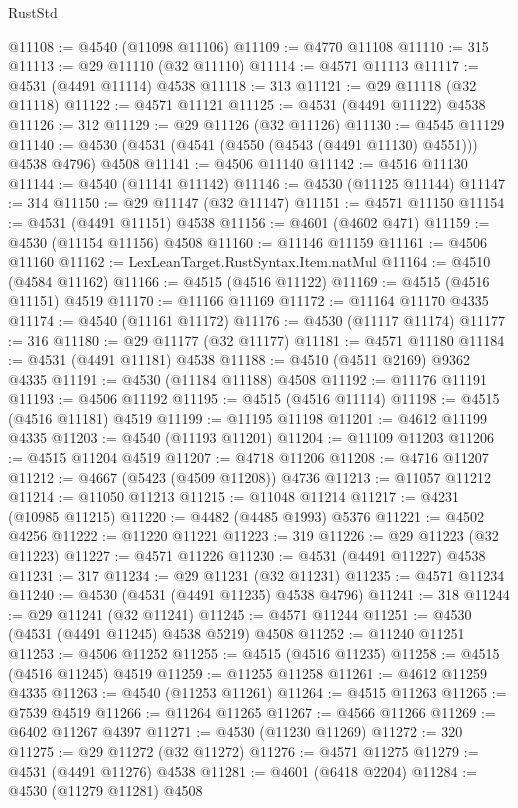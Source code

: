 \begin{lexlean}{RustStd}
\begin{coremodule}
@11108 := @4540 (@11098 @11106)
@11109 := @4770 @11108
@11110 := 315
@11113 := @29 @11110 (@32 @11110)
@11114 := @4571 @11113
@11117 := @4531 (@4491 @11114) @4538
@11118 := 313
@11121 := @29 @11118 (@32 @11118)
@11122 := @4571 @11121
@11125 := @4531 (@4491 @11122) @4538
@11126 := 312
@11129 := @29 @11126 (@32 @11126)
@11130 := @4545 @11129
@11140 := @4530 (@4531 (@4541 (@4550 (@4543 (@4491 @11130) @4551))) @4538 @4796) @4508
@11141 := @4506 @11140
@11142 := @4516 @11130
@11144 := @4540 (@11141 @11142)
@11146 := @4530 (@11125 @11144)
@11147 := 314
@11150 := @29 @11147 (@32 @11147)
@11151 := @4571 @11150
@11154 := @4531 (@4491 @11151) @4538
@11156 := @4601 (@4602 @471)
@11159 := @4530 (@11154 @11156) @4508
@11160 := @11146 @11159
@11161 := @4506 @11160
@11162 := LexLeanTarget.RustSyntax.Item.natMul
@11164 := @4510 (@4584 @11162)
@11166 := @4515 (@4516 @11122)
@11169 := @4515 (@4516 @11151) @4519
@11170 := @11166 @11169
@11172 := @11164 @11170 @4335
@11174 := @4540 (@11161 @11172)
@11176 := @4530 (@11117 @11174)
@11177 := 316
@11180 := @29 @11177 (@32 @11177)
@11181 := @4571 @11180
@11184 := @4531 (@4491 @11181) @4538
@11188 := @4510 (@4511 @2169) @9362 @4335
@11191 := @4530 (@11184 @11188) @4508
@11192 := @11176 @11191
@11193 := @4506 @11192
@11195 := @4515 (@4516 @11114)
@11198 := @4515 (@4516 @11181) @4519
@11199 := @11195 @11198
@11201 := @4612 @11199 @4335
@11203 := @4540 (@11193 @11201)
@11204 := @11109 @11203
@11206 := @4515 @11204 @4519
@11207 := @4718 @11206
@11208 := @4716 @11207
@11212 := @4667 (@5423 (@4509 @11208)) @4736
@11213 := @11057 @11212
@11214 := @11050 @11213
@11215 := @11048 @11214
@11217 := @4231 (@10985 @11215)
@11220 := @4482 (@4485 @1993) @5376
@11221 := @4502 @4256
@11222 := @11220 @11221
@11223 := 319
@11226 := @29 @11223 (@32 @11223)
@11227 := @4571 @11226
@11230 := @4531 (@4491 @11227) @4538
@11231 := 317
@11234 := @29 @11231 (@32 @11231)
@11235 := @4571 @11234
@11240 := @4530 (@4531 (@4491 @11235) @4538 @4796)
@11241 := 318
@11244 := @29 @11241 (@32 @11241)
@11245 := @4571 @11244
@11251 := @4530 (@4531 (@4491 @11245) @4538 @5219) @4508
@11252 := @11240 @11251
@11253 := @4506 @11252
@11255 := @4515 (@4516 @11235)
@11258 := @4515 (@4516 @11245) @4519
@11259 := @11255 @11258
@11261 := @4612 @11259 @4335
@11263 := @4540 (@11253 @11261)
@11264 := @4515 @11263
@11265 := @7539 @4519
@11266 := @11264 @11265
@11267 := @4566 @11266
@11269 := @6402 @11267 @4397
@11271 := @4530 (@11230 @11269)
@11272 := 320
@11275 := @29 @11272 (@32 @11272)
@11276 := @4571 @11275
@11279 := @4531 (@4491 @11276) @4538
@11281 := @4601 (@6418 @2204)
@11284 := @4530 (@11279 @11281) @4508

\end{coremodule}
\end{lexlean}
